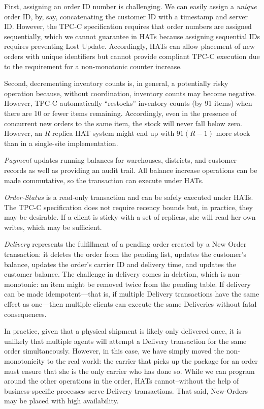 First, assigning an order ID number is challenging. We can easily
assign a \textit{unique} order ID, by, say, concatenating the customer
ID with a timestamp and server ID. However, the TPC-C specification
requires that order numbers are assigned sequentially, which we cannot
guarantee in HATs because assigning sequential IDs requires preventing
Lost Update. Accordingly, HATs can allow placement of new orders with
unique identifiers but cannot provide compliant TPC-C execution due to
the requirement for a non-monotonic counter increase.

Second, decrementing inventory counts is, in general, a potentially
risky operation because, without coordination, inventory counts may
become negative. However, TPC-C automatically ``restocks'' inventory
counts (by 91 items) when there are 10 or fewer items
remaining. Accordingly, even in the presence of concurrent new orders
to the same item, the stock will never fall below zero. However, an
$R$ replica HAT system might end up with $91(R-1)$ more stock than in
a single-site implementation.

\vspace{.5em}\noindent\textit{Payment} updates running balances for
warehouses, districts, and customer records as well as providing an
audit trail. All balance increase operations can be made commutative,
so the transaction can execute under HATs.

\vspace{.5em}\noindent\textit{Order-Status} is a read-only transaction
and can be safely executed under HATs. The TPC-C specification does
not require recency bounds but, in practice, they may be desirable. If
a client is sticky with a set of replicas, she will read her own
writes, which may be sufficient.

\vspace{.5em}\noindent\textit{Delivery} represents the fulfillment of
a pending order created by a New Order transaction: it deletes the
order from the pending list, updates the customer's balance, updates
the order's carrier ID and delivery time, and updates the customer
balance. The challenge in delivery comes in deletion, which is
non-monotonic: an item might be removed twice from the pending
table. If delivery can be made idempotent---that is, if multiple
Delivery transactions have the same effect as one---then multiple
clients can execute the same Deliveries without fatal consequences.

In practice, given that a physical shipment is likely only delivered
once, it is unlikely that multiple agents will attempt a Delivery
transaction for the same order simultaneously. However, in this case,
we have simply moved the non-monotonicity to the real world: the
carrier that picks up the package for an order must ensure that she is
the only carrier who has done so. While we can program around the
other operations in the order, HATs cannot--without the help of
business-specific processes--serve Delivery transactions. That said,
New-Orders may be placed with high availability.

